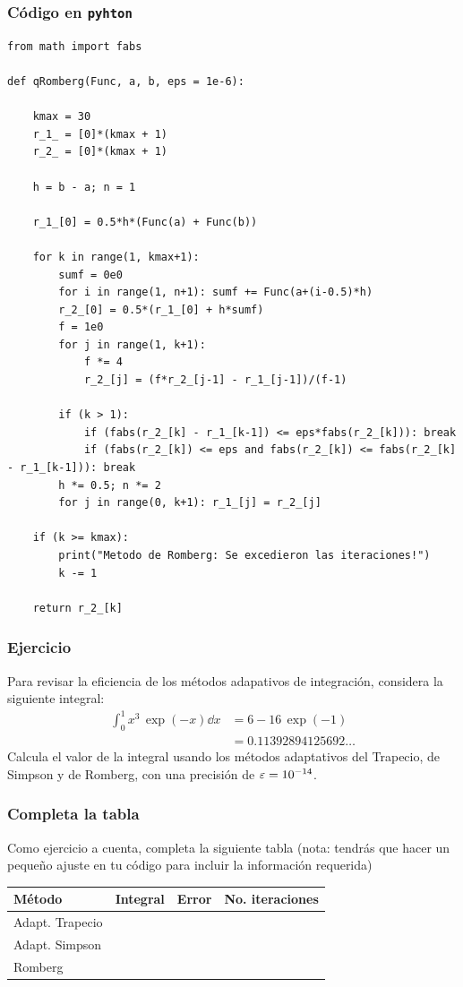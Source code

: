 \begin{frame}
\frametitle{Código en \texttt{pyhton}}
\begin{lstlisting}[caption=Código para el método de Romberg, style=FormattedNumber, basicstyle=\linespread{1.1}\ttfamily=\small, columns=fullflexible]
from math import fabs

def qRomberg(Func, a, b, eps = 1e-6):

    kmax = 30
    r_1_ = [0]*(kmax + 1)
    r_2_ = [0]*(kmax + 1)

    h = b - a; n = 1

    r_1_[0] = 0.5*h*(Func(a) + Func(b))
    
    for k in range(1, kmax+1):
        sumf = 0e0
        for i in range(1, n+1): sumf += Func(a+(i-0.5)*h)
        r_2_[0] = 0.5*(r_1_[0] + h*sumf)
        f = 1e0
        for j in range(1, k+1):
            f *= 4
            r_2_[j] = (f*r_2_[j-1] - r_1_[j-1])/(f-1)

        if (k > 1):
            if (fabs(r_2_[k] - r_1_[k-1]) <= eps*fabs(r_2_[k])): break
            if (fabs(r_2_[k]) <= eps and fabs(r_2_[k]) <= fabs(r_2_[k] - r_1_[k-1])): break
        h *= 0.5; n *= 2
        for j in range(0, k+1): r_1_[j] = r_2_[j]

    if (k >= kmax):
        print("Metodo de Romberg: Se excedieron las iteraciones!")
        k -= 1

    return r_2_[k]
\end{lstlisting}
\end{frame}
\begin{frame}
\frametitle{Ejercicio}
Para revisar la eficiencia de los métodos adapativos de integración, considera la siguiente integral:
\begin{align*}
\int_{0}^{1} x^{3} \, \exp(-x) \dd{x} &=  6 - 16 \, \exp(-1) \\
&=  0.11392894125692\ldots
\end{align*}
\pause
Calcula el valor de la integral usando los métodos adaptativos del Trapecio, de Simpson y de Romberg, con una precisión de $\varepsilon = \num{d-14}$.
\end{frame}
\begin{frame}
\frametitle{Completa la tabla}
Como ejercicio a cuenta, completa la siguiente tabla (nota: tendrás que hacer un pequeño ajuste en tu código para incluir la información requerida)
\begin{table}
\centering
\begin{tabular}{l c c c}
Método & Integral & Error & No. iteraciones \\\hline
Adapt. Trapecio & & & \\\hline
Adapt. Simpson & & & \\\hline
Romberg & & & \\\hline
\end{tabular}
\end{table}
\end{frame}
